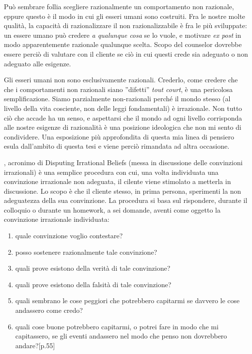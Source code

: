 Può sembrare follia scegliere razionalmente un comportamento non razionale, eppure questo è il modo in cui gli esseri umani sono costruiti. Fra le nostre molte qualità, la capacità di razionalizzare il non razionalizzabile è fra le più sviluppate: un essere umano può credere \emph{a qualunque cosa} se lo vuole, e motivare \emph{ex post} in modo apparentemente razionale qualunque scelta. Scopo del counselor dovrebbe essere perciò di valutare con il cliente se ciò in cui questi crede sia adeguato o non adeguato alle esigenze.

Gli esseri umani non sono esclusivamente\cite{predirr, blackswan} razionali. Crederlo, come credere che che i comportamenti non razionali siano ''difetti'' \emph{tout court}, è una pericolosa semplificazione. Siamo parzialmente non-razionali perché il mondo stesso (al livello della vita cosciente, non delle leggi fondamentali) è irrazionale. Non tutto ciò che accade ha un senso, e aspettarsi che il mondo ad ogni livello corrisponda alle nostre esigenze di razionalità è una posizione ideologica che non mi sento di condividere.
Una esposizione più approfondita di questa mia linea di pensiero esula dall'ambito di questa tesi e viene perciò rimandata ad altra occasione.

, acronimo di Disputing Irrational Beliefs (messa in discussione delle convinzioni irrazionali) è una semplice procedura con cui, una volta individuata una convinzione irrazionale non adeguata, il cilente viene stimolato a metterla in discussione. Lo scopo è che il cliente stesso, in prima persona, sperimenti la non adeguatezza della sua convinzione.
La procedura si basa sul rispondere, durante il colloquio o durante un homework, a sei domande, aventi come oggetto la convinzione irrazionale individuata:
\begin{enumerate}
\item quale convinzione voglio contestare?
\item posso sostenere razionalmente tale convinzione?
\item quali prove esistono della verità di tale convinzione?
\item quali prove esistono della falsità di tale convinzione?
\item quali sembrano le cose peggiori che potrebbero capitarmi se davvero le cose andassero come credo?
\item quali cose buone potrebbero capitarmi, o potrei fare in modo che mi capitassero, se gli eventi andassero nel modo che penso non dovrebbero andare?\cite{ret}[p.55]

\end{enumerate}


